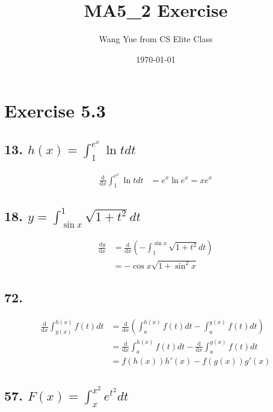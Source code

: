 \documentclass{article}
\begin{document}
    \title{MA5\_2 Exercise}
    \author{Wang Yue from CS Elite Class}
    \date{\today}

    \maketitle

    \section*{Exercise 5.3}

    \subsection*{13. $h(x) = \int_1^{e^x} \ln t dt$}

    $$\begin{aligned}
        \frac{\mathrm d}{\mathrm dx}\int_1^{e^x} \ln  t dt &= e^x\ln e^x = xe^x
    \end{aligned}$$

    \subsection*{18. $y = \int_{\sin x}^1\sqrt{1 + t^2} dt$}

    $$\begin{aligned}
        \frac{\mathrm dy}{\mathrm dx} &= \frac{\mathrm d}{\mathrm dx}(-\int_{1}^{\sin x}\sqrt{1 + t^2} dt) \\
        &= -\cos x\sqrt{1 + \sin ^2 x}
    \end{aligned}$$

    \subsection*{72. }


    $$\begin{aligned}
        \frac{\mathrm d}{\mathrm dx}\int_{g(x)}^{h(x)}f(t) dt &= \frac{\mathrm d}{\mathrm dx}(\int_{a}^{h(x)} f(t) dt - \int_{a}^{g(x)}f(t) dt) \\
        &= \frac{\mathrm d}{\mathrm dx}\int_{a}^{h(x)} f(t)dt - \frac{\mathrm d}{\mathrm dx}\int_{a}^{g(x)} f(t)dt \\
        &= f(h(x))h'(x) - f(g(x))g'(x)
    \end{aligned}$$

    \subsection*{57. $F(x) = \int_x^{x^2}e^{t^2} dt$}
\end{document}
